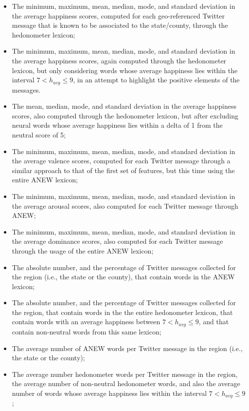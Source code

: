 \documentclass{acm_proc_article-sp}
\begin{document}
\begin{itemize}
\item The minimum, maximum, mean, median, mode, and standard deviation in the average happiness scores, computed for each geo-referenced Twitter message that is known to be associated to the state/county, through the hedonometer lexicon;
\item The minimum, maximum, mean, median, mode, and standard deviation in the average happiness scores, again computed through the hedonometer lexicon, but only considering words whose average happiness lies within the interval $7 < h_{avg} \leq 9$, in an attempt to highlight the positive elements of the messages.
\item The mean, median, mode, and standard deviation in the average happiness scores, also computed through the hedonometer lexicon, but after excluding neural words whose average happiness lies within a delta of 1 from the neutral score of 5;
\item The minimum, maximum, mean, median, mode, and standard deviation in the average valence scores, computed for each Twitter message through a similar approach to that of the first set of features, but this time using the entire ANEW lexicon;
\item The minimum, maximum, mean, median, mode, and standard deviation in the average arousal scores, also computed for each Twitter message through ANEW;
\item The minimum, maximum, mean, median, mode, and standard deviation in the average dominance scores, also computed for each Twitter message through the usage of the entire ANEW lexicon;
\item The absolute number, and the percentage of Twitter messages collected for the region (i.e., the state or the county), that contain words in the ANEW lexicon;
\item The absolute number, and the percentage of Twitter messages collected for the region, that contain words in the the entire hedonometer lexicon, that contain words with an average happiness between $7 < h_{avg} \leq 9$, and that contain non-neutral words from this same lexicon;
\item The average number of ANEW words per Twitter message in the region (i.e., the state or the county);
\item The average number hedonometer words per Twitter message in the region, the average number of non-neutral hedonometer words, and also the average number of words whose average happiness lies within the interval $7 < h_{avg} \leq 9$;
\end{itemize}
\end{document}
